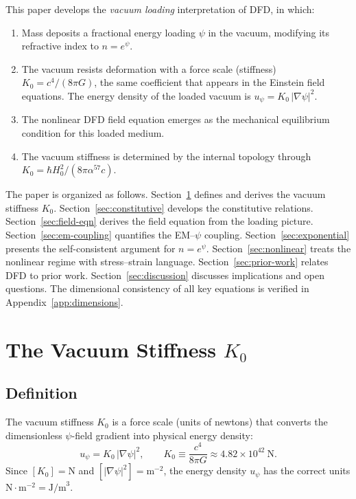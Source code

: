 \documentclass[aps,prd,twocolumn,superscriptaddress,nofootinbib]{revtex4-2}
\begin{document}
This paper develops the \emph{vacuum loading} interpretation of DFD,
in which:
\begin{enumerate}
\item Mass deposits a fractional energy loading $\psi$ in the vacuum,
modifying its refractive index to $n = e^\psi$.
\item The vacuum resists deformation with a force scale (stiffness)
$K_0 = c^4/(8\pi G)$, the same coefficient that appears in the
Einstein field equations.  The energy density of the loaded vacuum is
$u_\psi = K_0\,|\nabla\psi|^2$.
\item The nonlinear DFD field equation emerges as the mechanical
equilibrium condition for this loaded medium.
\item The vacuum stiffness is determined by the internal topology
through $K_0 = \hbar H_0^2/(8\pi\alpha^{57}c)$.
\end{enumerate}

The paper is organized as follows.  Section~\ref{sec:stiffness}
defines and derives the vacuum stiffness $K_0$.
Section~\ref{sec:constitutive} develops the constitutive relations.
Section~\ref{sec:field-eqn} derives the field equation from the
loading picture.  Section~\ref{sec:em-coupling} quantifies the
EM--$\psi$ coupling.  Section~\ref{sec:exponential} presents the
self-consistent argument for $n = e^\psi$.
Section~\ref{sec:nonlinear} treats the nonlinear regime with
stress--strain language.
Section~\ref{sec:prior-work} relates DFD to prior work.
Section~\ref{sec:discussion} discusses implications and open questions.
The dimensional consistency of all key equations is verified in
Appendix~\ref{app:dimensions}.


\section{The Vacuum Stiffness $K_0$}
\label{sec:stiffness}

\subsection{Definition}

The vacuum stiffness $K_0$ is a force scale (units of newtons) that
converts the dimensionless $\psi$-field gradient into physical energy
density:
\begin{equation}
u_\psi = K_0\,|\nabla\psi|^2, \qquad
\boxed{K_0 \equiv \frac{c^4}{8\pi G} \approx 4.82 \times 10^{42}~\text{N}.}
\label{eq:K0-def}
\end{equation}
Since $[K_0] = \text{N}$ and $[|\nabla\psi|^2] = \text{m}^{-2}$,
the energy density $u_\psi$ has the correct units
$\text{N}\cdot\text{m}^{-2} = \text{J/m}^3$.
\end{document}
